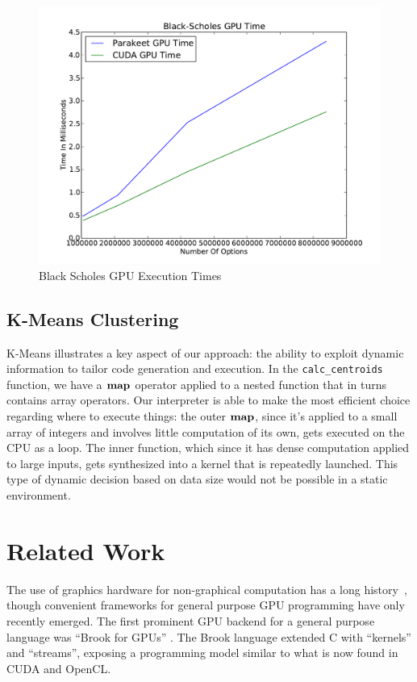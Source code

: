 \documentclass[preprint]{sigplanconf}
\begin{document}
\begin{figure}
\includegraphics[scale=0.45]{BSGPU.pdf}
\caption{Black Scholes GPU Execution Times}
\label{BSResults}
\end{figure}

\subsection{K-Means Clustering}

K-Means illustrates a key aspect of our approach: the ability to exploit dynamic information to tailor code generation and execution.  In the \texttt{calc\_centroids} function, we have a $\mbox{\textbf{map}}$ operator applied to a
nested function that in turns contains array operators.  Our interpreter is able to make the most efficient choice regarding where to execute things: the outer $\mbox{\textbf{map}}$, since it's applied to a small array of integers and involves little computation of its own, gets executed on the CPU as a loop.  The inner function, which since it has dense computation applied to large inputs, gets synthesized into a kernel that is repeatedly launched.  This type of dynamic decision based on data size would not be possible in a static environment.

\section{Related Work}
\label{RelatedWork}
The use of graphics hardware for non-graphical computation has a  long history~\cite{Lengyel90}, though convenient frameworks for general purpose GPU programming have only recently emerged. The first prominent GPU backend for a general purpose language was ``Brook for GPUs'' \cite{Buck04}. The Brook language extended C with ``kernels'' and ``streams'', exposing a programming model similar to what is now found in CUDA and OpenCL.
\end{document}
